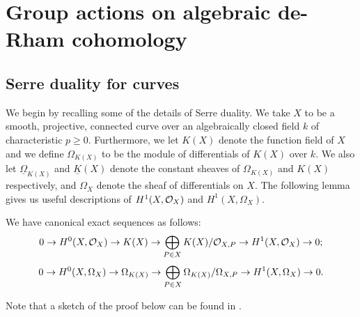 \chapter{Group actions on algebraic de-Rham cohomology} \label{Chapter:De-Rham cohomology}


\section{Serre duality for curves}


We begin by recalling some of the details of Serre duality.
We take $X$ to be a smooth, projective, connected curve over an algebraically closed field $k$ of characteristic $p \geq 0$.
Furthermore, we let $K(X)$ denote the function field of $X$ and we define $\Omega_{K(X)}$ to be the module of differentials of $K(X)$ over $k$.
We also let $\underline{\Omega}_{K(X)}$ and $\underline{K}(X)$ denote the constant sheaves of $\Omega_{K(X)}$ and $K(X)$ respectively, and $\Omega_X$ denote the sheaf of differentials on $X$.
The following lemma gives us useful descriptions of $H^1(X,\mathcal{O}_X)$ and $H^1(X,\Omega_X)$.
    \begin{lem}\label{lemmaexactsequenceofhoneandhzero}
    We have canonical exact sequences as follows:
        \begin{equation}\label{equationinitialdualitylesfunctions}
        0 \rightarrow H^0(X,{\cal O}_X) \rightarrow K(X) \rightarrow \bigoplus_{P \in X} K(X)/{\cal O}_{X,P} \rightarrow H^1(X,\mathcal{O}_X) \rightarrow  0;
        \end{equation}
        \begin{equation}\label{equationinitialdualitysesdifferentials}
        0 \rightarrow {H^0(X,\Omega_X)} \rightarrow \Omega_{K(X)} \rightarrow \bigoplus_{P \in X}\Omega_{K(X)}/\Omega_{X,P} \rightarrow H^1(X,\Omega_X) \rightarrow 0.
        \end{equation}
    \end{lem}
    \begin{rem}
    Note that a sketch of the proof below can be found in \cite[Pg.\ 248]{hart}.
        \end{rem}
